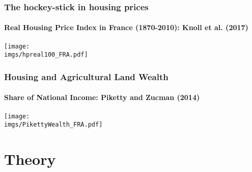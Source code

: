 \documentclass[aspectratio=169]{beamer}
\begin{document}



\begin{frame}
\frametitle{The hockey-stick in housing prices}
\framesubtitle{Real Housing Price Index in France (1870-2010): Knoll et al. (2017)}
	\begin{center}
		\texttt{[image: \\imgs/hpreal100\_FRA.pdf]}
	\end{center}
\end{frame}


\begin{v75mins}
\begin{frame}
\frametitle{Housing and Agricultural Land Wealth}
\framesubtitle{Share of National Income: Piketty and Zucman (2014)}
	\begin{center}
		\texttt{[image: \\imgs/PikettyWealth\_FRA.pdf]}
	\end{center}
\end{frame}\end{v75mins}



\section{Theory}
\end{document}
